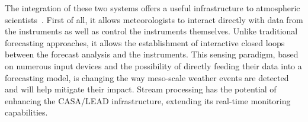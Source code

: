 The integration of these two systems offers a useful infrastructure to atmospheric
scientists~\cite{casa-lead}.  First of all, it allows meteorologists to interact directly with data from
the instruments as well as control the instruments themselves. Unlike traditional forecasting
approaches, it allows the establishment of interactive closed loops between the forecast analysis and the
instruments. This sensing paradigm, based on numerous input devices and the possibility of directly
feeding their data into a forecasting model, is changing the way meso-scale weather events are detected
and will help mitigate their impact. Stream processing has the potential of enhancing the CASA/LEAD
infrastructure, extending its real-time monitoring capabilities.

